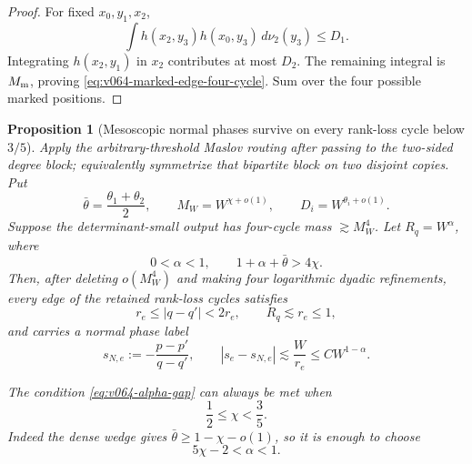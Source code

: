 \documentclass[10pt]{article}
\newtheorem{proposition}[theorem]{Proposition}
\begin{document}
\begin{proof}
For fixed \(x_0,y_1,x_2\),
\[
\int h(x_2,y_3)h(x_0,y_3)\,d\nu_2(y_3)
\le
D_1.
\]
Integrating \(h(x_2,y_1)\) in \(x_2\) contributes at most \(D_2\).  The remaining integral is
\(M_{\rm m}\), proving \eqref{eq:v064-marked-edge-four-cycle}.  Sum over the four possible marked
positions.
\end{proof}

\begin{proposition}[Mesoscopic normal phases survive on every rank-loss cycle below \(3/5\)]
\label{prop:v064-phase-labeled-rank-loss-cycles}
Apply the arbitrary-threshold Maslov routing after passing to the two-sided degree block; equivalently
symmetrize that bipartite block on two disjoint copies.  Put
\[
\bar\theta=\frac{\theta_1+\theta_2}{2},
\qquad
M_W=W^{\chi+o(1)},
\qquad
D_i=W^{\theta_i+o(1)}.
\]
Suppose the determinant-small output has four-cycle mass \(\gtrsim M_W^4\).  Let
\(R_q=W^\alpha\), where
\begin{equation}
\label{eq:v064-alpha-gap}
\boxed{
0<\alpha<1,
\qquad
1+\alpha+\bar\theta>4\chi.
}
\end{equation}
Then, after deleting \(o(M_W^4)\) and making four logarithmic dyadic refinements, every edge of the
retained rank-loss cycles satisfies
\begin{equation}
\label{eq:v064-four-shear-annuli}
\boxed{
r_e\le|q-q'|<2r_e,
\qquad
R_q\lesssim r_e\le1,
}
\end{equation}
and carries a normal phase label
\begin{equation}
\label{eq:v064-four-normal-phases}
\boxed{
s_{N,e}
:=
-\frac{p-p'}{q-q'},
\qquad
|s_e-s_{N,e}|
\lesssim
\frac{W}{r_e}
\le
C W^{1-\alpha}.
}
\end{equation}

The condition \eqref{eq:v064-alpha-gap} can always be met when
\begin{equation}
\label{eq:v064-automatic-three-fifths}
\boxed{\frac12\le\chi<\frac35.}
\end{equation}
Indeed the dense wedge gives \(\bar\theta\ge1-\chi-o(1)\), so it is enough to choose
\[
5\chi-2<\alpha<1.
\]
\end{proposition}
\end{document}
